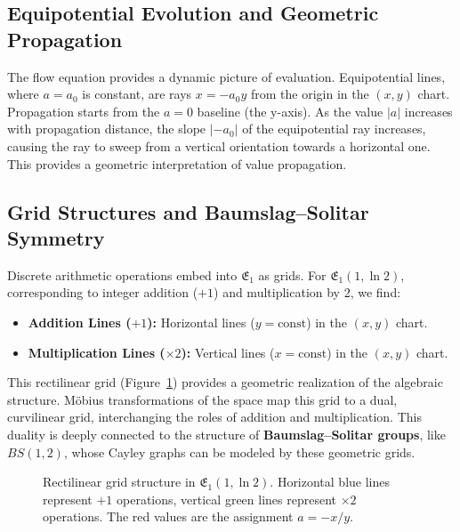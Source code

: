 \documentclass[12pt]{article}
\begin{document}
\subsection{Equipotential Evolution and Geometric Propagation}

The flow equation provides a dynamic picture of evaluation. Equipotential lines, where \( a = a_0 \) is constant, are rays \( x = -a_0 y \) from the origin in the \( (x, y) \) chart. Propagation starts from the \( a=0 \) baseline (the y-axis). As the value \( |a| \) increases with propagation distance, the slope \( |-a_0| \) of the equipotential ray increases, causing the ray to sweep from a vertical orientation towards a horizontal one. This provides a geometric interpretation of value propagation.

\subsection{Grid Structures and Baumslag–Solitar Symmetry}

Discrete arithmetic operations embed into \( \mathfrak{E}_1 \) as grids. For \( \mathfrak{E}_1(1, \ln 2) \), corresponding to integer addition (\(+1\)) and multiplication by 2, we find:
\begin{itemize}
    \item \textbf{Addition Lines (\(+1\)):} Horizontal lines (\( y = \text{const} \)) in the \( (x, y) \) chart.
    \item \textbf{Multiplication Lines (\(\times 2\)):} Vertical lines (\( x = \text{const} \)) in the \( (x, y) \) chart.
\end{itemize}
This rectilinear grid (Figure~\ref{fig:grid1_cs}) provides a geometric realization of the algebraic structure. Möbius transformations of the space map this grid to a dual, curvilinear grid, interchanging the roles of addition and multiplication. This duality is deeply connected to the structure of \textbf{Baumslag–Solitar groups}, like \( BS(1, 2) \), whose Cayley graphs can be modeled by these geometric grids.

\begin{figure}[ht]
\centering
{}
\caption{Rectilinear grid structure in \( \mathfrak{E}_1(1, \ln 2) \). Horizontal blue lines represent \(+1\) operations, vertical green lines represent \(\times 2\) operations. The red values are the assignment \(a = -x/y\).}
\label{fig:grid1_cs}
\end{figure}
\end{document}
